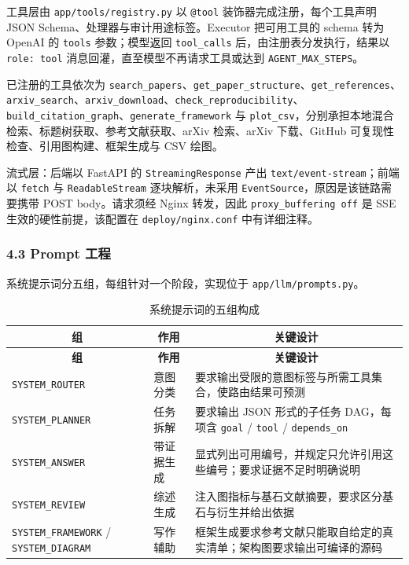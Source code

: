 \documentclass[UTF8,fontset=windows,zihao=5,a4paper]{ctexart}
\begin{document}
工具层由 \texttt{app/tools/registry.py} 以 \texttt{@tool} 装饰器完成注册，每个工具声明 JSON Schema、处理器与审计用途标签。Executor 把可用工具的 schema 转为 OpenAI 的 \texttt{tools} 参数；模型返回 \texttt{tool\_\allowbreak{}calls} 后，由注册表分发执行，结果以 \texttt{role: tool} 消息回灌，直至模型不再请求工具或达到 \texttt{AGENT\_\allowbreak{}MAX\_\allowbreak{}STEPS}。

已注册的工具依次为 \texttt{search\_\allowbreak{}papers}、\texttt{get\_\allowbreak{}paper\_\allowbreak{}structure}、\texttt{get\_\allowbreak{}references}、\texttt{arxiv\_\allowbreak{}search}、\texttt{arxiv\_\allowbreak{}download}、\texttt{check\_\allowbreak{}reproducibility}、\texttt{build\_\allowbreak{}citation\_\allowbreak{}graph}、\texttt{generate\_\allowbreak{}framework} 与 \texttt{plot\_\allowbreak{}csv}，分别承担本地混合检索、标题树获取、参考文献获取、arXiv 检索、arXiv 下载、GitHub 可复现性检查、引用图构建、框架生成与 CSV 绘图。

流式层：后端以 FastAPI 的 \texttt{StreamingResponse} 产出 \texttt{text/event-stream}；前端以 \texttt{fetch} 与 \texttt{ReadableStream} 逐块解析，未采用 \texttt{EventSource}，原因是该链路需要携带 POST body。请求须经 Nginx 转发，因此 \texttt{proxy\_\allowbreak{}buffering off} 是 SSE 生效的硬性前提，该配置在 \texttt{deploy/nginx.conf} 中有详细注释。

\subsubsection*{4.3 Prompt 工程}
系统提示词分五组，每组针对一个阶段，实现位于 \texttt{app/llm/prompts.py}。

\begin{longtable}{@{}p{}p{}p{}@{}}
\caption{系统提示词的五组构成}\\
\toprule
\multicolumn{1}{c}{\textbf{组}} & \multicolumn{1}{c}{\textbf{作用}} & \multicolumn{1}{c}{\textbf{关键设计}} \\
\midrule
\endfirsthead
\toprule
\multicolumn{1}{c}{\textbf{组}} & \multicolumn{1}{c}{\textbf{作用}} & \multicolumn{1}{c}{\textbf{关键设计}} \\
\midrule
\endhead
\bottomrule
\endfoot
\texttt{SYSTEM\_\allowbreak{}ROUTER} & 意图分类 & 要求输出受限的意图标签与所需工具集合，使路由结果可预测 \\
\texttt{SYSTEM\_\allowbreak{}PLANNER} & 任务拆解 & 要求输出 JSON 形式的子任务 DAG，每项含 \texttt{goal} / \texttt{tool} / \texttt{depends\_\allowbreak{}on} \\
\texttt{SYSTEM\_\allowbreak{}ANSWER} & 带证据生成 & 显式列出可用编号，并规定只允许引用这些编号；要求证据不足时明确说明 \\
\texttt{SYSTEM\_\allowbreak{}REVIEW} & 综述生成 & 注入图指标与基石文献摘要，要求区分基石与衍生并给出依据 \\
\texttt{SYSTEM\_\allowbreak{}FRAMEWORK} / \texttt{SYSTEM\_\allowbreak{}DIAGRAM} & 写作辅助 & 框架生成要求参考文献只能取自给定的真实清单；架构图要求输出可编译的源码 \\
\end{longtable}
\end{document}

